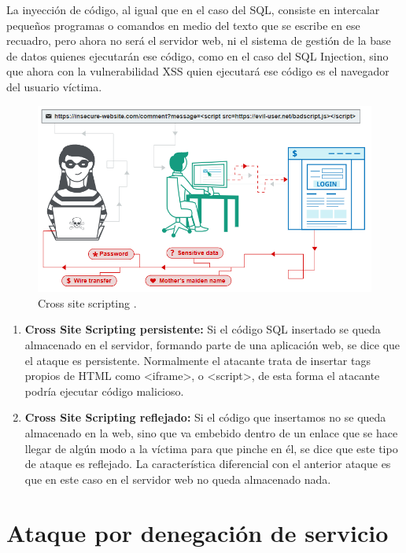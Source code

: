 La inyección de código, al igual que en el caso del SQL, consiste en intercalar pequeños programas o comandos en medio del texto que se escribe en ese recuadro, 
pero ahora no será el servidor web, ni el sistema de gestión de la base de datos quienes ejecutarán ese código, como en el caso del SQL Injection, sino que ahora 
con la vulnerabilidad XSS quien ejecutará ese código es el navegador del usuario víctima. \cite{xss2}

\begin{figure}[tphb]
  		   \centering
     		   \includegraphics[width=5in]{xss.png}
  		   \caption{Cross site scripting \cite{xss}.}
  		   \label{img:xss}
\end{figure}

\begin{enumerate}
\item {\bfseries Cross Site Scripting persistente:}
Si el código SQL insertado se queda almacenado en el servidor, formando parte de una aplicación web, se dice que el ataque es persistente. Normalmente el atacante
trata de insertar tags propios de HTML como <iframe>, o <script>, de esta forma el atacante podría ejecutar código malicioso.

\item {\bfseries Cross Site Scripting reflejado:}
Si el código que insertamos no se queda almacenado en la web, sino que va embebido dentro de un enlace que se hace llegar de algún modo a la víctima para que 
pinche en él, se dice que este tipo de ataque es reflejado. La característica diferencial con el anterior ataque es que en este caso en el servidor web no queda almacenado nada.

\end{enumerate}

\section{Ataque por denegación de servicio}
\label{sec:denegacion-servicio}


